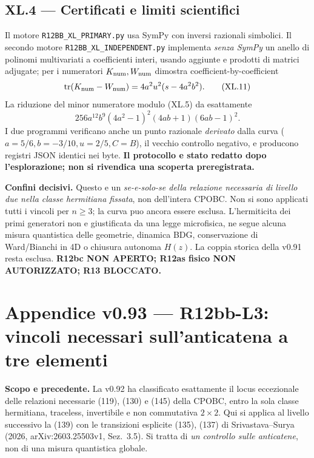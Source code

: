 \documentclass[11pt,a4paper]{article}
\begin{document}
\subsection*{XL.4 --- Certificati e limiti scientifici}
Il motore \texttt{R12BB\_XL\_PRIMARY.py} usa SymPy con inversi razionali simbolici. Il secondo motore \texttt{R12BB\_XL\_INDEPENDENT.py} implementa \emph{senza SymPy} un anello di polinomi multivariati a coefficienti interi, usando aggiunte e prodotti di matrici adjugate; per i numeratori $K_{\rm num},W_{\rm num}$ dimostra coefficient-by-coefficient
\begin{equation}
 \operatorname{tr}(K_{\rm num}-W_{\rm num})=4a^2u^2(s-4a^2b^2).\tag{XL.11}
\end{equation}
La riduzione del minor numeratore modulo (XL.5) da esattamente
\begin{equation}
 256a^{12}b^9(4a^2-1)^2(4ab+1)(6ab-1)^2.\tag{XL.12}
\end{equation}
I due programmi verificano anche un punto razionale \emph{derivato} dalla curva ($a=5/6,b=-3/10,u=2/5,C=B$), il vecchio controllo negativo, e producono registri JSON identici nei byte. \textbf{Il protocollo e stato redatto dopo l'esplorazione; non si rivendica una scoperta preregistrata.}

\textbf{Confini decisivi.} Questo e un \emph{se-e-solo-se della relazione necessaria di livello due nella classe hermitiana fissata}, non dell'intera CPOBC. Non si sono applicati tutti i vincoli per $n\ge3$; la curva puo ancora essere esclusa. L'hermiticita dei primi generatori non e giustificata da una legge microfisica, ne segue alcuna misura quantistica delle geometrie, dinamica BDG, conservazione di Ward/Bianchi in 4D o chiusura autonoma $H(z)$. La coppia storica della v0.91 resta esclusa. \textbf{R12bc NON APERTO; R12as fisico NON AUTORIZZATO; R13 BLOCCATO.}
\endgroup
\clearpage
\begingroup
\setlength{\parskip}{0.14em}
\section*{Appendice v0.93 --- R12bb-L3: vincoli necessari sull'anticatena a tre elementi}
\textbf{Scopo e precedente.} La v0.92 ha classificato esattamente il locus eccezionale delle relazioni necessarie (119), (130) e (145) della CPOBC, entro la sola classe hermitiana, traceless, invertibile e non commutativa $2\times2$. Qui si applica al livello successivo la (139) con le transizioni esplicite (135), (137) di Srivastava--Surya (2026, arXiv:2603.25503v1, Sez.~3.5). Si tratta di \emph{un controllo sulle anticatene}, non di una misura quantistica globale.
\end{document}

